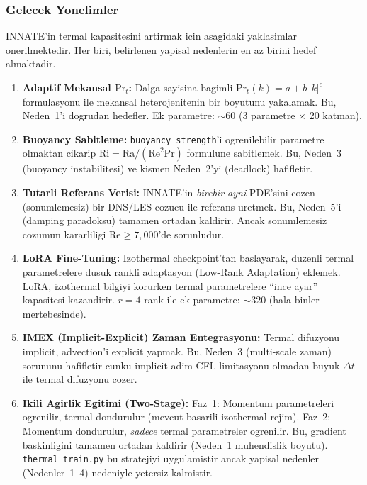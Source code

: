 \subsubsection{Gelecek Yonelimler}

INNATE'in termal kapasitesini artirmak icin asagidaki yaklasimlar
onerilmektedir. Her biri, belirlenen yapisal nedenlerin en az birini
hedef almaktadir.

\begin{enumerate}
  \item \textbf{Adaptif Mekansal $\text{Pr}_t$:}
        Dalga sayisina bagimli $\text{Pr}_t(k) = a + b\,|k|^c$ formulasyonu
        ile mekansal heterojenitenin bir boyutunu yakalamak. Bu, Neden~1'i
        dogrudan hedefler. Ek parametre: $\sim 60$ (3 parametre $\times$ 20
        katman).

  \item \textbf{Buoyancy Sabitleme:}
        \texttt{buoyancy\_strength}'i ogrenilebilir parametre olmaktan
        cikarip $\text{Ri} = \text{Ra}/(\text{Re}^2\text{Pr})$ formulune
        sabitlemek. Bu, Neden~3 (buoyancy instabilitesi) ve kismen
        Neden~2'yi (deadlock) hafifletir.

  \item \textbf{Tutarli Referans Verisi:}
        INNATE'in \emph{birebir ayni} PDE'sini cozen (sonumlemesiz)
        bir DNS/LES cozucu ile referans uretmek. Bu, Neden~5'i
        (damping paradoksu) tamamen ortadan kaldirir. Ancak sonumlemesiz
        cozumun kararliligi $\text{Re} \geq 7{,}000$'de sorunludur.

  \item \textbf{LoRA Fine-Tuning:}
        Izothermal checkpoint'tan baslayarak, duzenli termal parametrelere
        dusuk rankli adaptasyon (Low-Rank Adaptation) eklemek. LoRA,
        izothermal bilgiyi korurken termal parametrelere ``ince ayar''
        kapasitesi kazandirir. $r = 4$ rank ile ek parametre: $\sim 320$
        (hala binler mertebesinde).

  \item \textbf{IMEX (Implicit-Explicit) Zaman Entegrasyonu:}
        Termal difuzyonu implicit, advection'i explicit yapmak.
        Bu, Neden~3 (multi-scale zaman) sorununu hafifletir cunku
        implicit adim CFL limitasyonu olmadan buyuk $\Delta t$ ile
        termal difuzyonu cozer.

  \item \textbf{Ikili Agirlik Egitimi (Two-Stage):}
        Faz~1: Momentum parametreleri ogrenilir, termal dondurulur (mevcut
        basarili izothermal rejim). Faz~2: Momentum dondurulur, \emph{sadece}
        termal parametreler ogrenilir. Bu, gradient baskinligini tamamen
        ortadan kaldirir (Neden~1 muhendislik boyutu).
        \texttt{thermal\_train.py} bu stratejiyi uygulamistir ancak
        yapisal nedenler (Nedenler~1--4) nedeniyle yetersiz kalmistir.
\end{enumerate}


